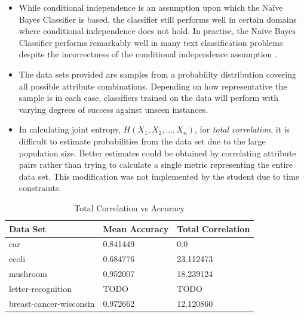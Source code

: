 \documentclass[10pt]{report}
\begin{document}
\begin{itemize}
  \item While conditional independence is an assumption upon which the
    Na\"{i}ve Bayes Classifier is based, the classifier still performs
    well in certain domains where conditional independence does not
    hold. In practise, the Na\"{i}ve Bayes Classifier performs
    remarkably well in many text classification problems despite the
    incorrectness of the conditional independence assumption
    \cite{Mitchell1997}. 

  \item The data sets provided are samples from a probability
    distribution covering all possible attribute
    combinations. Depending on how representative the sample is in
    each case, classifiers trained on the data will perform with
    varying degrees of success against unseen instances.

  \item In calculating joint entropy, \(H(X_1,X_2,...,X_n)\), for
    \textit{total correlation}, it is difficult to estimate
    probabilities from the data set due to the large population
    size. Better estimates could be obtained by correlating attribute
    pairs rather than trying to calculate a single metric
    representing the entire data set. This modification was not
    implemented by the student due to time constraints. 
\end{itemize}

\begin{table}[h]
  \centering
  \begin{tabular}{ |l|l|l|} 
    \hline
    \textbf{Data Set} & \textbf{Mean Accuracy} & \textbf{Total Correlation} \\ \hline
    car                      &  0.841449  &  0.0       \\ \hline
    ecoli                    &  0.684776  &  23.112473 \\ \hline
    mushroom                 &  0.952007  &  18.239124 \\ \hline
    letter-recognition       &  TODO      &  TODO      \\ \hline
    breast-cancer-wisconsin  &  0.972662  &  12.120860 \\ \hline
  \end{tabular}
  \caption{Total Correlation vs Accuracy}
  \label{tab:correlation}
\end{table}
\end{document}
